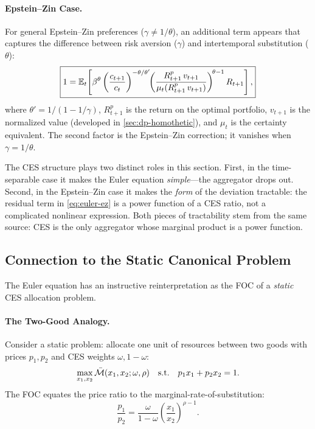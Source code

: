 \paragraph{Epstein--Zin Case.}
For general Epstein--Zin preferences ($\gamma \neq 1/\theta$), an additional term appears that captures the difference between risk aversion ($\gamma$) and intertemporal substitution ($\theta$):
\begin{equation}
\boxed{1 = \mathbb{E}_t\!\left[ \beta^\theta \left(\frac{c_{t+1}}{c_t}\right)^{-\theta/\theta'} \!\!\left(\frac{R_{t+1}^p \, v_{t+1}}{\mu_t(R_{t+1}^p \, v_{t+1})}\right)^{\!\theta - 1} R_{t+1} \right],}
\label{eq:euler-ez}
\end{equation}
where $\theta' = 1/(1 - 1/\gamma)$, $R_{t+1}^p$ is the return on the optimal portfolio, $v_{t+1}$ is the normalized value (developed in \cref{sec:dp-homothetic}), and $\mu_t$ is the certainty equivalent. The second factor is the Epstein--Zin correction; it vanishes when $\gamma = 1/\theta$.

\begin{calloutnote}
The CES structure plays two distinct roles in this section. First, in the time-separable case it makes the Euler equation \emph{simple}---the aggregator drops out. Second, in the Epstein--Zin case it makes the \emph{form} of the deviation tractable: the residual term in \cref{eq:euler-ez} is a power function of a CES ratio, not a complicated nonlinear expression. Both pieces of tractability stem from the same source: CES is the only aggregator whose marginal product is a power function.
\end{calloutnote}

\subsection{Connection to the Static Canonical Problem}
\label{subsec:dp-static-connection}

The Euler equation has an instructive reinterpretation as the FOC of a \emph{static} CES allocation problem.

\paragraph{The Two-Good Analogy.}
Consider a static problem: allocate one unit of resources between two goods with prices $p_1, p_2$ and CES weights $\omega, 1-\omega$:
\begin{equation}
\max_{x_1, x_2} \bar{\mathcal{M}}(x_1, x_2; \omega, \rho) \quad \text{s.t.} \quad p_1 x_1 + p_2 x_2 = 1.
\label{eq:static-ces}
\end{equation}
The FOC equates the price ratio to the marginal-rate-of-substitution:
\begin{equation}
\frac{p_1}{p_2} = \frac{\omega}{1-\omega} \left( \frac{x_1}{x_2} \right)^{\rho-1}.
\label{eq:static-foc}
\end{equation}

